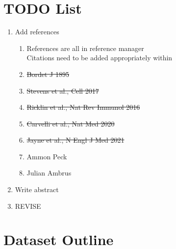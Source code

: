 \documentclass[times, twoside, watermark]{zHenriquesLab-StyleBioRxiv}
\begin{document}
\section{TODO List} \label{note:Note1} 
\begin{enumerate}
	\item Add references
		\begin{enumerate}
			\item References are all in reference manager
			\\ Citations need to be added appropriately within
			\item \sout{Bordet J 1895}
			\item \sout{Stevens et al., Cell 2017}
			\item \sout{Ricklin et al., Nat Rev Immunol 2016}
			\item \sout{Carvelli et al., Nat Med 2020}
			\item \sout{Jayne et al., N Engl J Med 2021}
			\item Ammon Peck
			\item Julian Ambrus
		\end{enumerate}
	\item Write abstract
	\item REVISE
\end{enumerate}

\section{Dataset Outline} \label{note:Note2} 
\end{document}
